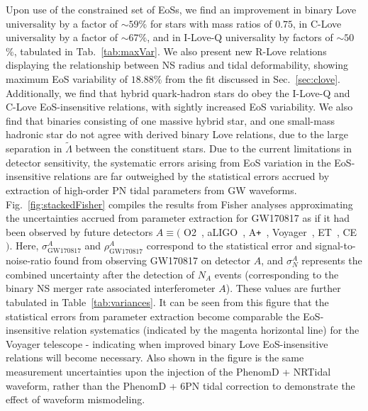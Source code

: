 \documentclass[prd,twocolumn,nofootinbib,superscriptaddress,amsmath,amssymb]{revtex4-1}
\begin{document}
Upon use of the constrained set of EoSs, we find an improvement in binary Love universality by a factor of $\sim 59$\% for stars with mass ratios of $0.75$, in C-Love universality by a factor of $\sim 67\%$, and in I-Love-Q universality by factors of $\sim50$\%, tabulated in Tab.~\ref{tab:maxVar}.
We also present new R-Love relations displaying the relationship between NS radius and tidal deformability, showing maximum EoS variability of $18.88\%$ from the fit discussed in Sec.~\ref{sec:clove}.
Additionally, we find that hybrid quark-hadron stars do obey the I-Love-Q and C-Love EoS-insensitive relations, with sightly increased EoS variability.
We also find that binaries consisting of one massive hybrid star, and one small-mass hadronic star do not agree with derived binary Love relations, due to the large separation in $\tilde{\Lambda}$ between the constituent stars.
Due to the current limitations in detector sensitivity, the systematic errors arising from EoS variation in the EoS-insensitive relations are far outweighed by the statistical errors accrued by extraction of high-order PN tidal parameters from GW waveforms.
Fig.~\ref{fig:stackedFisher} compiles the results from Fisher analyses approximating the uncertainties accrued from parameter extraction for GW170817 as if it had been observed by future detectors $A \equiv ($ O2~\cite{aLIGO}, aLIGO~\cite{aLIGO}, A\texttt{+}~\cite{Ap_Voyager_CE}, Voyager~\cite{Ap_Voyager_CE}, ET~\cite{ET}, CE~\cite{Ap_Voyager_CE}$)$.
Here, $\sigma^A_{\text{GW170817}}$ and $\rho^A_{\text{GW170817}}$ correspond to the statistical error and signal-to-noise-ratio found from observing GW170817 on detector $A$, and $\sigma^A_N$ represents the combined uncertainty after the detection of $N_A$ events (corresponding to the binary NS merger rate associated interferometer $A$).
These values are further tabulated in Table~\ref{tab:variances}.
It can be seen from this figure that the statistical errors from parameter extraction become comparable the EoS-insensitive relation systematics (indicated by the magenta horizontal line) for the Voyager telescope - indicating when improved binary Love EoS-insensitive relations will become necessary.
Also shown in the figure is the same measurement uncertainties upon the injection of the PhenomD + NRTidal waveform, rather than the PhenomD + 6PN tidal correction to demonstrate the effect of waveform mismodeling.
\end{document}
